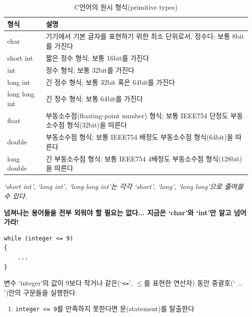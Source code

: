 \documentclass[a4paper,12pt]{book}
\newcommand{\V}[1]{\Verb|#1|}
\begin{document}
\begin{table}[H]
    \centering

    \caption{C언어의 원시 형식(primitive types)}
    \label{Tab:primitive-types}

    \begin{tabular}{ || m{6em} | m{24em} || }
        \hline
        형식           & 설명 \\
        \hline\hline
        char          & 기기에서 기본 글자를 표현하기 위한 최소 단위로서, 정수다; 보통 8bit를 가진다 \\
        \hline
        \hline
        short int     & 짧은 정수 형식; 보통 16bit를 가진다 \\
        \hline
        int           & 정수 형식; 보통 32bit를 가진다 \\
        \hline
        long int      & 긴 정수 형식; 보통 32bit 혹은 64bit를 가진다 \\
        \hline
        long long int & 긴 정수 형식; 보통 64bit를 가진다 \\
        \hline
        \hline
        float         & 부동소수점(floating-point number) 형식; 보통 IEEE754 단정도 부동소수점 형식(32bit)을 따른다 \\
        \hline
        double        & 부동소수점 형식; 보통 IEEE754 배정도 부동소수점 형식(64bit)을 따른다 \\
        \hline
        long double   & 긴 부동소수점 형식; 보통 IEEE754 4배정도 부동소수점 형식(128bit)을 따른다 \\
        \hline
    \end{tabular}
    \newline
    \textit{\color{gray} \small `short int', `long int', `long long int'는 각각
    `short', `long', `long long'으로 줄여쓸 수 있다.}
\end{table}

\textbf{
    넘쳐나는 용어들을 전부 외워야 할 필요는 없다...
    지금은 `char'와 `int'만 알고 넘어가라!
}

\begin{lstlisting}
while (integer <= 9)
{
    ...
}
\end{lstlisting}

변수 `integer'의 값이 9보다 작거나 같은(`\verb+<=+', $\le$를 표현한 연산자) 동안
중괄호(`{ ... }')안의 구문들을 실행한다.

\begin{enumerate}
    \item \V{integer <= 9}를 만족하지 못한다면 문(statement)를 탈출한다
\end{enumerate}
\end{document}
